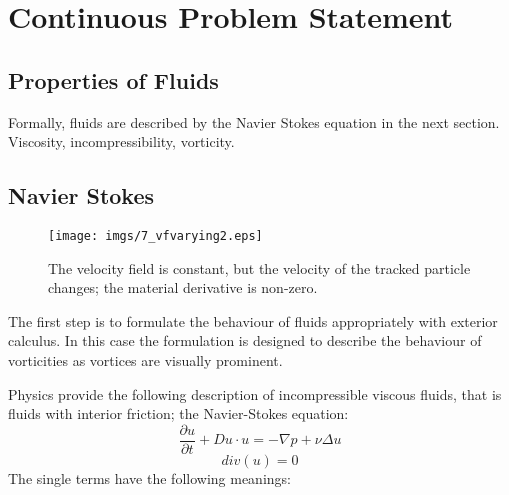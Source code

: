 
\section{Continuous Problem Statement}

\subsection{Properties of Fluids}
Formally, fluids are described by the Navier Stokes equation in the next section. Viscosity, incompressibility, vorticity.  

\subsection{Navier Stokes}

\begin{figure}%
\begin{center}
\texttt{[image: imgs/7\_vfvarying2.eps]}%
\end{center}
\caption{The velocity field is constant, but the velocity of the tracked particle changes; the material derivative is non-zero.}%
\label{fig:fsmaterialderivative}%
\end{figure}

The first step is to formulate the behaviour of fluids appropriately with exterior calculus. In this case the formulation is designed to describe the behaviour of vorticities as vortices are visually prominent.

Physics provide the following description of incompressible viscous fluids, that is fluids with interior friction; the Navier-Stokes equation:
\[\frac{\partial u}{\partial t} + Du \cdot u = -\nabla p + \nu \Delta u\]
\begin{equation}div(u) = 0\label{eq:NS}\end{equation} 
The single terms have the following meanings:

